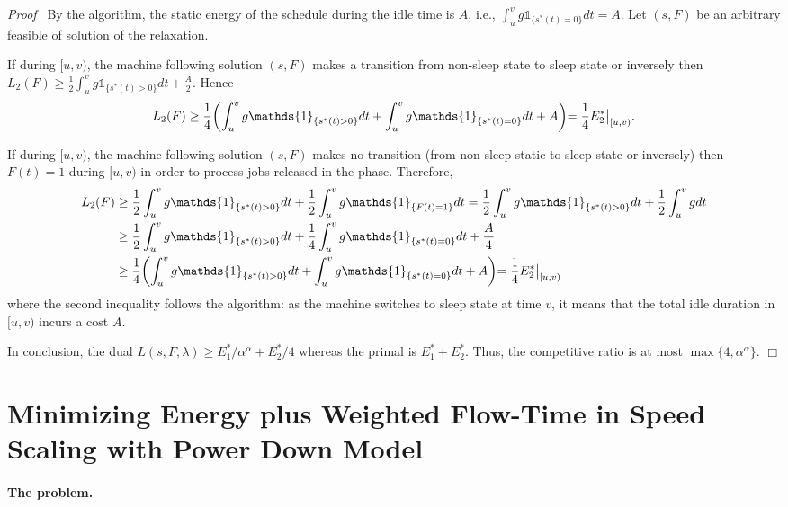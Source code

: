 \documentclass[11pt]{article}
\newenvironment{proof}{\noindent\emph{Proof\ }}{\hspace*{\fill}$\Box$\medskip}
\newcommand\restr[2]{{\left.\kern-\nulldelimiterspace #1 \vphantom{\big|} \right|_{#2} }}
\newcommand{\one}{\ensuremath{\mathds{1}}}
\begin{document}
\begin{proof}
By the algorithm, the static energy of the schedule during 
the idle time is $A$, \linebreak i.e., $\int_{u}^{v}  g\one_{\{s^{*}(t) = 0\}} dt = A$. 
Let $(s,F)$ be an arbitrary feasible of solution of the relaxation. 

If during $[u,v)$, the machine following solution $(s,F)$ makes a transition from
non-sleep state to sleep state or inversely then 
$L_{2}(F) \geq \frac{1}{2} \int_{u}^{v} g \one_{\{s^{*}(t) > 0\}} dt + \frac{A}{2}$. Hence
$$
L_{2}(F) \geq \frac{1}{4} \biggl( \int_{u}^{v} g \one_{\{s^{*}(t) > 0\}} dt 
	      	+  \int_{u}^{v}  g \one_{\{s^{*}(t) = 0\}}dt + A \biggl) = \frac{1}{4}\restr{E^{*}_{2}}{[u,v)}.
$$


If during $[u,v)$, the machine following solution $(s,F)$ makes no transition (from
non-sleep static to sleep state or inversely) then $F(t) = 1$ during $[u,v)$ in order to 
process jobs released in the phase. Therefore, 
\begin{align*}
L_{2}(F) &\geq \frac{1}{2} \int_{u}^{v} g \one_{\{s^{*}(t) > 0\}} dt 
		+ \frac{1}{2} \int_{u}^{v} g \one_{\{F(t) =1\}} dt 
		=  \frac{1}{2} \int_{u}^{v} g \one_{\{s^{*}(t) > 0\}} dt 
		+ \frac{1}{2} \int_{u}^{v} g dt \\
	      & \geq \frac{1}{2} \int_{u}^{v} g \one_{\{s^{*}(t) > 0\}} dt 
	      	+ \frac{1}{4} \int_{u}^{v}  g \one_{\{s^{*}(t) = 0\}}dt + \frac{A}{4} \\
	      & \geq \frac{1}{4} \biggl( \int_{u}^{v} g \one_{\{s^{*}(t) > 0\}} dt 
	      	+  \int_{u}^{v}  g \one_{\{s^{*}(t) = 0\}}dt + A \biggl) = \frac{1}{4}\restr{E^{*}_{2}}{[u,v)}
\end{align*}
where the second inequality follows the algorithm: as the machine switches to sleep state 
at time $v$, it means that the total idle duration in $[u,v)$ incurs a cost $A$.

In conclusion, the dual $L(s,F,\lambda) \geq E^{*}_{1}/\alpha^{\alpha} + E^{*}_{2}/4$
whereas the primal is $E^{*}_{1}+ E^{*}_{2}$. Thus, 
the competitive ratio is at most $\max\{4,\alpha^{\alpha}\}$.
\end{proof}


\section{Minimizing Energy plus Weighted Flow-Time in Speed Scaling with 
Power Down Model}		\label{sec:4S-energy+flow}

\paragraph{The problem.} 
\end{document}
